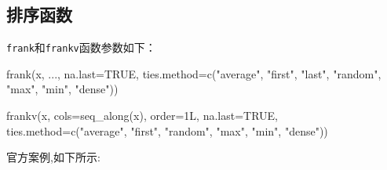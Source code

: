 \documentclass[
]{book}
\newenvironment{Shaded}{\begin{snugshade}}{\end{snugshade}}
\newcommand{\AttributeTok}[1]{\textcolor[rgb]{0.77,0.63,0.00}{#1}}
\newcommand{\ConstantTok}[1]{\textcolor[rgb]{0.00,0.00,0.00}{#1}}
\newcommand{\FunctionTok}[1]{\textcolor[rgb]{0.00,0.00,0.00}{#1}}
\newcommand{\NormalTok}[1]{#1}
\newcommand{\StringTok}[1]{\textcolor[rgb]{0.31,0.60,0.02}{#1}}
\begin{document}
\hypertarget{ux6392ux5e8fux51fdux6570-1}{%
\subsection{排序函数}\label{ux6392ux5e8fux51fdux6570-1}}

\texttt{frank}和\texttt{frankv}函数参数如下：

\begin{Shaded}
\begin{Highlighting}[]
\FunctionTok{frank}\NormalTok{(x, ..., }\AttributeTok{na.last=}\ConstantTok{TRUE}\NormalTok{, }\AttributeTok{ties.method=}\FunctionTok{c}\NormalTok{(}\StringTok{"average"}\NormalTok{,}
  \StringTok{"first"}\NormalTok{, }\StringTok{"last"}\NormalTok{, }\StringTok{"random"}\NormalTok{, }\StringTok{"max"}\NormalTok{, }\StringTok{"min"}\NormalTok{, }\StringTok{"dense"}\NormalTok{))}

\FunctionTok{frankv}\NormalTok{(x, }\AttributeTok{cols=}\FunctionTok{seq\_along}\NormalTok{(x), }\AttributeTok{order=}\NormalTok{1L, }\AttributeTok{na.last=}\ConstantTok{TRUE}\NormalTok{,}
      \AttributeTok{ties.method=}\FunctionTok{c}\NormalTok{(}\StringTok{"average"}\NormalTok{, }\StringTok{"first"}\NormalTok{, }\StringTok{"random"}\NormalTok{,}
        \StringTok{"max"}\NormalTok{, }\StringTok{"min"}\NormalTok{, }\StringTok{"dense"}\NormalTok{))}
\end{Highlighting}
\end{Shaded}

官方案例,如下所示:
\end{document}
